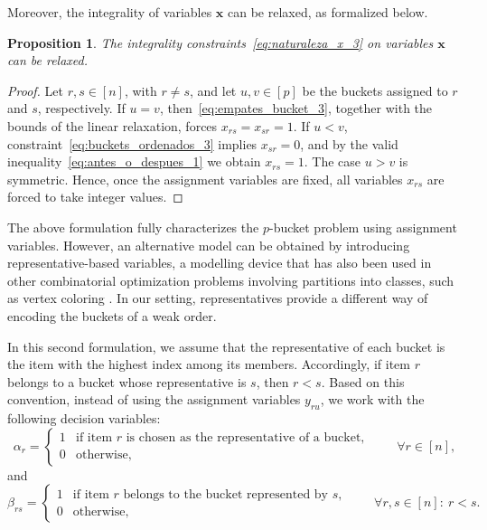 \documentclass[pdflatex,basic,Numbered]{jnl}%
\theoremstyle{plain}
\newtheorem{prop}{Proposition}
\theoremstyle{remark}
\theoremstyle{thmstyleone}%
\theoremstyle{thmstylethree}%
\begin{document}
Moreover, the integrality of variables \(\bm{x}\) can be relaxed, as formalized below.

\begin{prop}\label{prop:relax_x_assignment}
The integrality constraints~\eqref{eq:naturaleza_x_3} on variables \(\bm{x}\) can be relaxed.
\end{prop}

\begin{proof}
Let \(r,s\in[n]\), with \(r\neq s\), and let \(u,v\in[p]\) be the buckets assigned to \(r\) and \(s\), respectively. If \(u=v\), then~\eqref{eq:empates_bucket_3}, together with the bounds of the linear relaxation, forces \(x_{rs}=x_{sr}=1\). If \(u<v\), constraint~\eqref{eq:buckets_ordenados_3} implies \(x_{sr}=0\), and by the valid inequality~\eqref{eq:antes_o_despues_1} we obtain \(x_{rs}=1\). The case \(u>v\) is symmetric. Hence, once the assignment variables are fixed, all variables \(x_{rs}\) are forced to take integer values.
\end{proof}

The above formulation fully characterizes the \(p\)-bucket problem using assignment variables. 
However, an alternative model can be obtained by introducing representative-based variables, 
a modelling device that has also been used in other combinatorial optimization problems involving 
partitions into classes, such as vertex coloring \citep{campelo2008asymmetric}. 
In our setting, representatives provide a different way of encoding the buckets of a weak order.

In this second formulation, we assume that the representative of each bucket is the item with the 
highest index among its members. Accordingly, if item \(r\) belongs to a bucket whose representative 
is \(s\), then \(r < s\). Based on this convention, instead of using the assignment variables \(y_{ru}\), 
we work with the following decision variables:
\[
\alpha_r=
\begin{cases}
1 & \text{if item } r \text{ is chosen as the representative of a bucket},\\
0 & \text{otherwise},
\end{cases}
\qquad \forall r\in[n],
\]
and
\[
\beta_{rs}=
\begin{cases}
1 & \text{if item } r \text{ belongs to the bucket represented by } s,\\
0 & \text{otherwise},
\end{cases}
\qquad \forall r,s\in[n]:\ r<s.
\]
\end{document}
